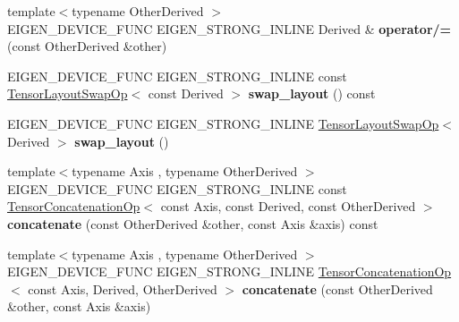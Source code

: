 \begin{DoxyCompactItemize}
{\footnotesize template$<$typename Other\+Derived $>$ }\\E\+I\+G\+E\+N\+\_\+\+D\+E\+V\+I\+C\+E\+\_\+\+F\+U\+NC E\+I\+G\+E\+N\+\_\+\+S\+T\+R\+O\+N\+G\+\_\+\+I\+N\+L\+I\+NE Derived \& {\bfseries operator/=} (const Other\+Derived \&other)
\item 
\mbox{\label{class_eigen_1_1_tensor_base_a342b9da2268a7f7880060eac66949b08}} 
E\+I\+G\+E\+N\+\_\+\+D\+E\+V\+I\+C\+E\+\_\+\+F\+U\+NC E\+I\+G\+E\+N\+\_\+\+S\+T\+R\+O\+N\+G\+\_\+\+I\+N\+L\+I\+NE const \hyperlink{class_eigen_1_1_tensor_layout_swap_op}{Tensor\+Layout\+Swap\+Op}$<$ const Derived $>$ {\bfseries swap\+\_\+layout} () const
\item 
\mbox{\label{class_eigen_1_1_tensor_base_a8c7275270857b89dbcbcab4b6ab07a3c}} 
E\+I\+G\+E\+N\+\_\+\+D\+E\+V\+I\+C\+E\+\_\+\+F\+U\+NC E\+I\+G\+E\+N\+\_\+\+S\+T\+R\+O\+N\+G\+\_\+\+I\+N\+L\+I\+NE \hyperlink{class_eigen_1_1_tensor_layout_swap_op}{Tensor\+Layout\+Swap\+Op}$<$ Derived $>$ {\bfseries swap\+\_\+layout} ()
\item 
\mbox{\label{class_eigen_1_1_tensor_base_a5a55034f8232851cfc18f641b07cf3d5}} 
{\footnotesize template$<$typename Axis , typename Other\+Derived $>$ }\\E\+I\+G\+E\+N\+\_\+\+D\+E\+V\+I\+C\+E\+\_\+\+F\+U\+NC E\+I\+G\+E\+N\+\_\+\+S\+T\+R\+O\+N\+G\+\_\+\+I\+N\+L\+I\+NE const \hyperlink{class_eigen_1_1_tensor_concatenation_op}{Tensor\+Concatenation\+Op}$<$ const Axis, const Derived, const Other\+Derived $>$ {\bfseries concatenate} (const Other\+Derived \&other, const Axis \&axis) const
\item 
\mbox{\label{class_eigen_1_1_tensor_base_a569391e23a84bd853b1dad6142eaed26}} 
{\footnotesize template$<$typename Axis , typename Other\+Derived $>$ }\\E\+I\+G\+E\+N\+\_\+\+D\+E\+V\+I\+C\+E\+\_\+\+F\+U\+NC E\+I\+G\+E\+N\+\_\+\+S\+T\+R\+O\+N\+G\+\_\+\+I\+N\+L\+I\+NE \hyperlink{class_eigen_1_1_tensor_concatenation_op}{Tensor\+Concatenation\+Op}$<$ const Axis, Derived, Other\+Derived $>$ {\bfseries concatenate} (const Other\+Derived \&other, const Axis \&axis)
\item 
\mbox{\label{class_eigen_1_1_tensor_base_a375aa0fca9f21dbc5fccb2227172e950}} 

\end{DoxyCompactItemize}
